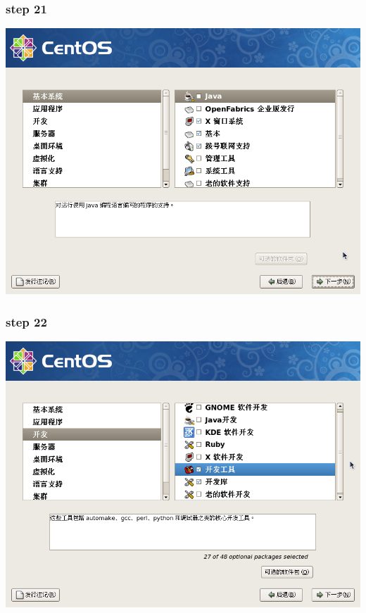 \documentclass[xcolor=svgnames,presentation]{beamer}
\begin{document}
\begin{frame}
\frametitle{step 21}
\label{sec-2-21}

\begin{center}
\includegraphics[width=.9\linewidth]{img/img30.png}
\end{center}
\end{frame}
\begin{frame}
\frametitle{step 22}
\label{sec-2-22}

\begin{center}
\includegraphics[width=.9\linewidth]{img/img31.png}
\end{center}
\end{frame}
\end{document}
